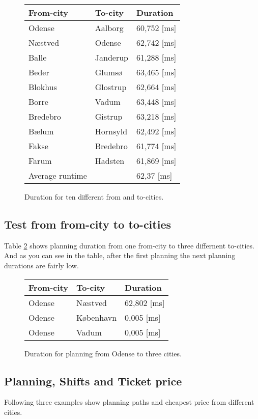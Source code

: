 \begin{figure}[th!]
\centering
\begin{tabular}{l|l|l}
From-city & To-city & Duration \\\hline
Odense & Aalborg & 60,752 [ms] \\
Næstved & Odense & 62,742 [ms] \\
Balle & Janderup & 61,288 [ms] \\
Beder & Glumsø & 63,465 [ms] \\
Blokhus & Glostrup & 62,664 [ms] \\
Borre & Vadum & 63,448 [ms] \\
Bredebro & Gistrup & 63,218 [ms] \\
Bælum & Hornsyld & 62,492 [ms] \\
Fakse & Bredebro & 61,774 [ms] \\
Farum & Hadsten & 61,869 [ms] \\\hline
Average runtime && 62,37 [ms]
\end{tabular}
\captionsetup{type=table}
\caption[tekst i indholdsfortegnelsen]{Duration for ten different from and to-cities.}
\label{tb:fromtoten}
\end{figure}



\subsection{Test from from-city to to-cities}
Table \ref{tb:fromonetocities} shows planning duration from one from-city to three differnent to-cities. And as you can see in the table, after the first planning the next planning durations are fairly low.
\begin{figure}[th!]
\centering
\begin{tabular}{l|l|l}
From-city & To-city & Duration \\\hline
Odense & Næstved & 62,802 [ms] \\
Odense & København & 0,005 [ms] \\
Odense & Vadum & 0,005 [ms]  
\end{tabular}
\captionsetup{type=table}
\caption[tekst i indholdsfortegnelsen]{Duration for planning from Odense to three cities.}
\label{tb:fromonetocities}
\end{figure}


\subsection{Planning, Shifts and Ticket price}
Following three examples show planning paths and cheapest price from different cities.

